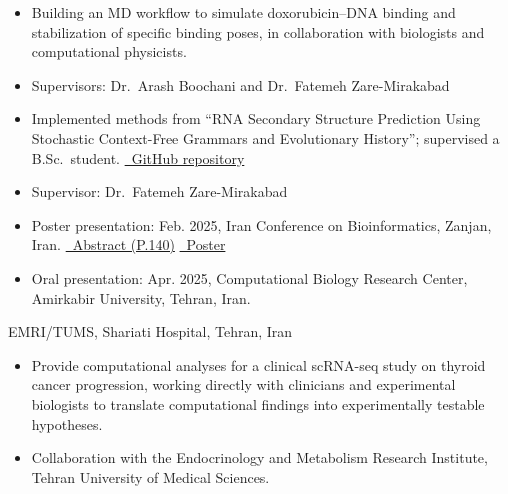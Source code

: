\documentclass[11pt,a4paper,ragged2e]{altacv}
\begin{document}
\begin{itemize}[label=\textcolor{purpleDaffodi}{\textbullet}]
    \item Building an MD workflow to simulate doxorubicin--DNA binding and stabilization of specific binding poses, in collaboration with biologists and computational physicists.
    \item Supervisors: Dr.\ Arash Boochani and Dr.\ Fatemeh Zare-Mirakabad
\end{itemize}

\begin{itemize}[label=\textcolor{purpleDaffodi}{\textbullet}]
    \item Implemented methods from ``RNA Secondary Structure Prediction Using Stochastic Context-Free Grammars and Evolutionary History''; supervised a B.Sc.\ student. \href{https://github.com/Mr-Ahmadi/RNA-Secondary-Structure-Prediction}{\color{cdate}\faLink\ GitHub repository}
    \item Supervisor: Dr.\ Fatemeh Zare-Mirakabad
\end{itemize}



\begin{itemize}[label=\textcolor{purpleDaffodi}{\textbullet}]
    \item Poster presentation: Feb. 2025, Iran Conference on Bioinformatics, Zanjan, Iran.
      \href{https://icb13.znu.ac.ir/Areas/Panel/Hamayesh/1/Files/booklet_(1).pdf}{\color{cdate}\faLink\ Abstract (P.140)}  
    \href{https://fatemeabolhassani.github.io/Portfolio-Website/assets/Glioblastoma_Poster.pdf}{\color{cdate}\faLink\ Poster}
    \item Oral presentation: Apr. 2025, Computational Biology Research Center, Amirkabir University, Tehran, Iran.
\end{itemize}
\normalsize

{EMRI/TUMS, Shariati Hospital, Tehran, Iran}{}
\begin{itemize}[label=\textcolor{purpleDaffodi}{\textbullet}]
\item Provide computational analyses for a clinical scRNA-seq study on thyroid cancer progression, working directly with
clinicians and experimental biologists to translate computational findings into experimentally testable hypotheses.
\item Collaboration with the Endocrinology and Metabolism Research Institute, Tehran University of Medical Sciences.
\end{itemize}
\end{document}
